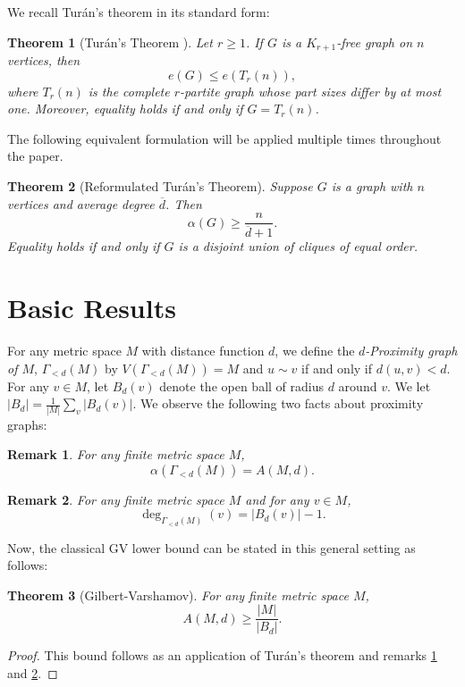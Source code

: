 \documentclass[12pt]{article}
\newtheorem{theorem}{Theorem}
\newtheorem{remark}{Remark}
\begin{document}

\noindent We recall Tur\'an's theorem in its standard form:

\begin{theorem}[Turán's Theorem {\cite{turan1941}}]
    Let $r\geq 1$. If $G$ is a $K_{r+1}$-free graph on $n$ vertices, then
\[
e(G)\leq e(T_r(n)),
\]
where $T_r(n)$ is the complete $r$-partite graph whose part sizes differ by at most one. Moreover, equality holds if and only if $G=T_r(n)$.
\end{theorem}

\noindent The following equivalent formulation will be applied multiple times throughout the paper.

\begin{theorem}[Reformulated Tur\'an’s Theorem]
    \label{thm: turan}
    Suppose $G$ is a graph with $n$ vertices and average degree $\overline d$. Then 
    \[
    \alpha(G)\geq\frac{n}{\overline{d}+1}.
    \]
    Equality holds if and only if $G$ is a disjoint union of cliques of equal order.
\end{theorem}



\section{Basic Results}

For any metric space $M$ with distance function $d$, we define the \textit{$d$-Proximity graph of $M$}, $\Gamma_{<d}(M)$ by $V(\Gamma_{<d}(M))=M$ and $u\sim v$ if and only if $d(u,v)<d$. For any $v\in M$, let $B_d(v)$ denote the open ball of radius $d$ around $v$. We  let $|B_d|=\frac{1}{|M|}\sum_{v}|B_d(v)|$. We observe the following two facts about proximity graphs:
\begin{remark}
\label{rmk: ind-code}
    For any finite metric space $M$, 
    \[
    \alpha(\Gamma_{<d}(M))=A(M,d).
    \]
\end{remark}

\begin{remark}
\label{rmk: degree-ball}
    For any finite metric space $M$ and for any $v\in M$, 
    \[
    \deg_{\Gamma_{<d}(M)}(v)=|B_d(v)|-1.
    \]
\end{remark}



\noindent Now, the classical GV lower bound can be stated in this  general setting as follows:
\begin{theorem}[Gilbert-Varshamov]
\label{thm: GV}
    For any finite metric space $M$, 
    \[
    A(M,d)\geq\frac{|M|}{|B_d|}.
    \]
\end{theorem}
\begin{proof}
This bound follows as an application of Tur\'an's theorem and remarks \ref{rmk: ind-code} and \ref{rmk: degree-ball}. 
\end{proof}
\end{document}
